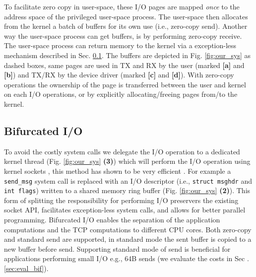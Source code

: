 To facilitate zero copy in user-space, these I/O pages are mapped \emph{once} to the address space of the privileged user-space process. The user-space then allocates from the kernel a batch of buffers for its own use (i.e., zero-copy send). Another way the user-space process can get \oursys buffers, is by performing zero-copy receive. The user-space process can return memory to the kernel via a exception-less mechanism described in Sec. \ref{sec:bifurcated}.
The \oursys buffers are depicted in Fig. \ref{fig:our_sys} as dashed boxes, same pages are used in TX and RX by the user (marked \textbf{[a]} and \textbf{[b]}) and TX/RX by the device driver (marked \textbf{[c]} and \textbf{[d]}). With zero-copy operations the ownership of the page is transferred between the user and kernel on each I/O operations, or by explicitly allocating/freeing pages from/to the kernel.
\subsection{Bifurcated I/O}\label{sec:bifurcated}
To avoid the costly system calls we delegate the I/O operation to a dedicated kernel thread (Fig. \ref{fig:our_sys} \textbf{(3)}) which will perform the I/O operation using kernel sockets \cite{ktcp}, this method has shown to be very efficient . For example a \texttt{send\_msg} system call is replaced with an I/O descriptor (i.e., \texttt{struct msghdr} and \texttt{int flags}) written to a shared memory ring buffer (Fig. \ref{fig:our_sys} \textbf{(2)}). This form of splitting the responsibility for performing I/O preservers the existing socket API, facilitates exception-less system calls, and allows for better parallel programming. Bifurcated I/O enables the separation of the application computations and the TCP computations to different CPU cores. Both zero-copy and standard send are supported, in standard mode the sent buffer is copied to a new \oursys buffer before send. Supporting standard mode of send is beneficial for applications performing small I/O e.g., 64B sends (we evaluate the costs in Sec .\ref{sec:eval_bif}).



